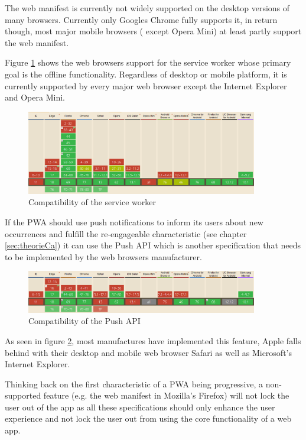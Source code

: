 The web manifest is currently not widely supported on the desktop versions of many browsers. Currently only Googles Chrome fully supports it, in return though, most major mobile browsers ( except Opera Mini) at least partly support the web manifest. 

Figure \ref{fig:pwacompatibilityserviceworker} shows the web browsers support for the service worker whose primary goal is the offline functionality. Regardless of desktop or mobile platform, it is currently supported by every major web browser except the Internet Explorer and Opera Mini.

\begin{figure}[htbp] 
	\centering
	\includegraphics[width=0.9\textwidth]{Assets/chapter_pwa/serviceworkersupport.PNG}
	\caption{Compatibility of the service worker}
	\label{fig:pwacompatibilityserviceworker}
\end{figure}

If the \acs{PWA} should use push notifications to inform its users about new occurrences and fulfill the re-engageable characteristic (see chapter \ref{sec:theorieCa}) it can use the Push API which is another specification that needs to be implemented by the web browsers manufacturer.

\begin{figure}[htbp] 
	\centering
	\includegraphics[width=0.9\textwidth]{Assets/chapter_pwa/pushapisupport.PNG}
	\caption{Compatibility of the Push API}
	\label{fig:pwacompatibilitypushapi}
\end{figure}

As seen in figure \ref{fig:pwacompatibilitypushapi}, most manufactures have implemented this feature, Apple falls behind with their desktop and mobile web browser Safari as well as Microsoft’s Internet Explorer.

Thinking back on the first characteristic of a \acs{PWA} being progressive, a non-supported feature (e.g. the web manifest in Mozilla's Firefox) will not lock the user out of the app as all these specifications should only enhance the user experience and not lock the user out from using the core functionality of a web app.